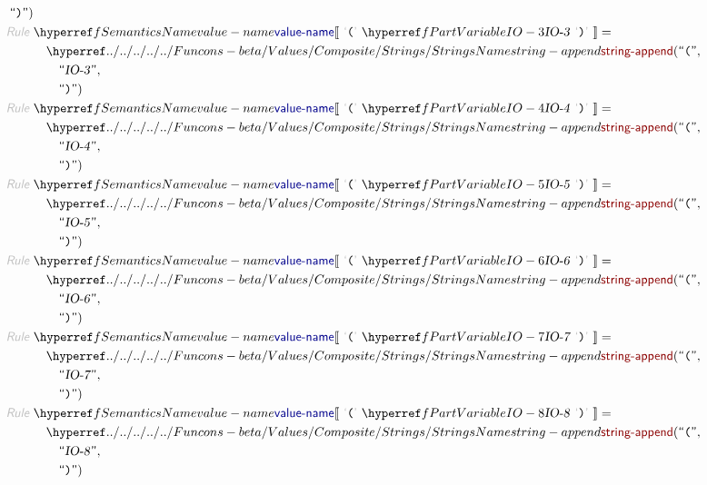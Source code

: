 \begin{align*}
          \STRING{)} )
\\
  \KEY{Rule} ~ 
    & \SEMREF{value-name} \LEFTPHRASE ~ \LEX{(} ~ \VARREF{IO-3} ~ \LEX{)} ~ \RIGHTPHRASE  = \\&\quad
      \NAMEHYPER{../../../../../Funcons-beta/Values/Composite}{Strings}{string-append}
        ( \STRING{(}, \\&\quad \quad 
          \textsf{\textquotedblleft}\VAR{IO-3}\textsf{\textquotedblright}, \\&\quad \quad 
          \STRING{)} )
\\
  \KEY{Rule} ~ 
    & \SEMREF{value-name} \LEFTPHRASE ~ \LEX{(} ~ \VARREF{IO-4} ~ \LEX{)} ~ \RIGHTPHRASE  = \\&\quad
      \NAMEHYPER{../../../../../Funcons-beta/Values/Composite}{Strings}{string-append}
        ( \STRING{(}, \\&\quad \quad 
          \textsf{\textquotedblleft}\VAR{IO-4}\textsf{\textquotedblright}, \\&\quad \quad 
          \STRING{)} )
\\
  \KEY{Rule} ~ 
    & \SEMREF{value-name} \LEFTPHRASE ~ \LEX{(} ~ \VARREF{IO-5} ~ \LEX{)} ~ \RIGHTPHRASE  = \\&\quad
      \NAMEHYPER{../../../../../Funcons-beta/Values/Composite}{Strings}{string-append}
        ( \STRING{(}, \\&\quad \quad 
          \textsf{\textquotedblleft}\VAR{IO-5}\textsf{\textquotedblright}, \\&\quad \quad 
          \STRING{)} )
\\
  \KEY{Rule} ~ 
    & \SEMREF{value-name} \LEFTPHRASE ~ \LEX{(} ~ \VARREF{IO-6} ~ \LEX{)} ~ \RIGHTPHRASE  = \\&\quad
      \NAMEHYPER{../../../../../Funcons-beta/Values/Composite}{Strings}{string-append}
        ( \STRING{(}, \\&\quad \quad 
          \textsf{\textquotedblleft}\VAR{IO-6}\textsf{\textquotedblright}, \\&\quad \quad 
          \STRING{)} )
\\
  \KEY{Rule} ~ 
    & \SEMREF{value-name} \LEFTPHRASE ~ \LEX{(} ~ \VARREF{IO-7} ~ \LEX{)} ~ \RIGHTPHRASE  = \\&\quad
      \NAMEHYPER{../../../../../Funcons-beta/Values/Composite}{Strings}{string-append}
        ( \STRING{(}, \\&\quad \quad 
          \textsf{\textquotedblleft}\VAR{IO-7}\textsf{\textquotedblright}, \\&\quad \quad 
          \STRING{)} )
\\
  \KEY{Rule} ~ 
    & \SEMREF{value-name} \LEFTPHRASE ~ \LEX{(} ~ \VARREF{IO-8} ~ \LEX{)} ~ \RIGHTPHRASE  = \\&\quad
      \NAMEHYPER{../../../../../Funcons-beta/Values/Composite}{Strings}{string-append}
        ( \STRING{(}, \\&\quad \quad 
          \textsf{\textquotedblleft}\VAR{IO-8}\textsf{\textquotedblright}, \\&\quad \quad 
          \STRING{)} )
\end{align*}
